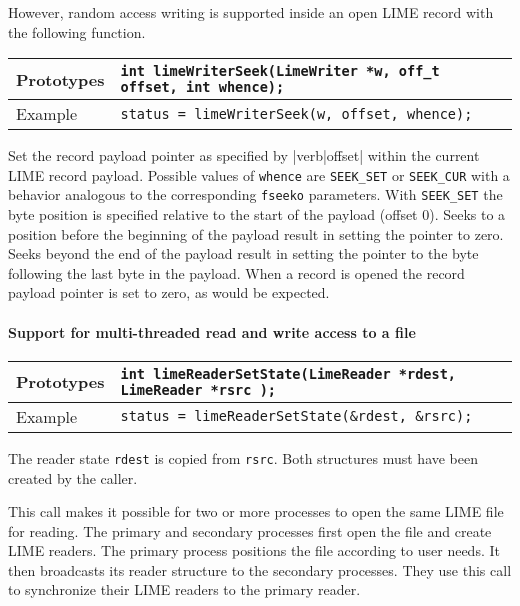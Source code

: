 \documentclass{article}
\begin{document}
However, random access writing is supported inside an open LIME record
with the following function.

%
\begin{flushleft}
  \begin{tabular}{|l|l|}
  \hline
  Prototypes     & \verb|int limeWriterSeek(LimeWriter *w, off_t offset, int whence);| \\
\hline
  Example  & \verb|status = limeWriterSeek(w, offset, whence);| \\
   \hline
 \end{tabular}
\end{flushleft}
%
Set the record payload pointer as specified by |verb|offset| within
the current LIME record payload.  Possible values of \verb|whence| are
\verb|SEEK_SET| or \verb|SEEK_CUR| with a behavior analogous to the
corresponding \verb|fseeko| parameters.  With \verb|SEEK_SET| the byte
position is specified relative to the start of the payload (offset 0).
Seeks to a position before the beginning of the payload result in
setting the pointer to zero.  Seeks beyond the end of the payload
result in setting the pointer to the byte following the last byte in
the payload.  When a record is opened the record payload pointer is
set to zero, as would be expected.


\paragraph{Support for multi-threaded read and write access to a file}

%
\begin{flushleft}
  \begin{tabular}{|l|l|}
  \hline
  Prototypes     & \verb|int limeReaderSetState(LimeReader *rdest, LimeReader *rsrc );| \\
\hline
  Example  & \verb|status = limeReaderSetState(&rdest, &rsrc);| \\
   \hline
 \end{tabular}
\end{flushleft}
%
The reader state \verb|rdest| is copied from \verb|rsrc|.  Both
structures must have been created by the caller.  

This call makes it possible for two or more processes to open the same
LIME file for reading.  The primary and secondary processes first open
the file and create LIME readers.  The primary process positions the
file according to user needs.  It then broadcasts its reader structure
to the secondary processes.  They use this call to synchronize their
LIME readers to the primary reader.
\end{document}
